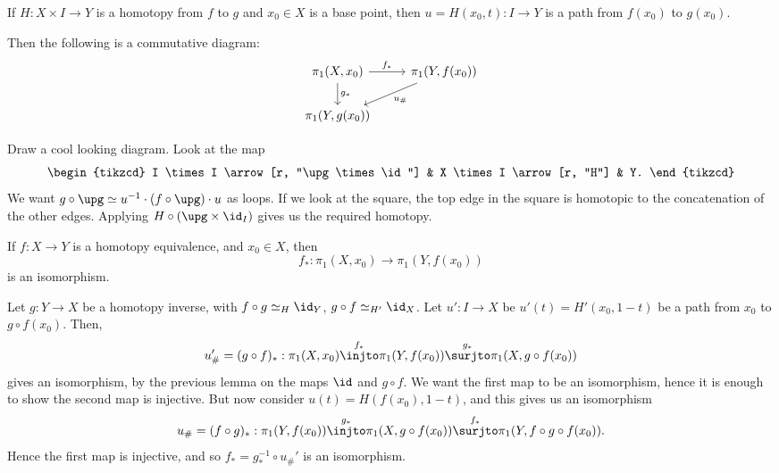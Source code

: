 \documentclass[12pt]{article}
\begin{document}
\begin{lemma}
	If $H : X \times I \to Y$ is a homotopy from $f$ to $g$ and $x_0 \in X$ is a base point, then $u = H(x_0, t) : I \to Y$ is a path from $f(x_0)$ to $g(x_0)$.

	Then the following is a commutative diagram:
	\[
	\begin{tikzcd}
		\pi_1(X, x_0) \arrow[r, "f_\ast"] \arrow[d, "g_\ast"] & \pi_1(Y, f(x_0)) \arrow[dl, "u_{\#}"] \\
		\pi_1(Y, g(x_0)) &
	\end{tikzcd}
\]
\end{lemma}

\begin{proofbox}
	Draw a cool looking diagram. Look at the map
	\[
	\begin{tikzcd}
		I \times I \arrow[r, "\upg \times \id"] & X \times I \arrow[r, "H"] & Y.
	\end{tikzcd}
	\]
	We want $g \circ \upg \simeq u^{-1} \cdot (f \circ \upg) \cdot u$ as loops. If we look at the square, the top edge in the square is homotopic to the concatenation of the other edges. Applying $H \circ (\upg\times \id_I)$ gives us the required homotopy.
\end{proofbox}


\begin{theorem}
	If $f : X \to Y$ is a homotopy equivalence, and $x_0 \in X$, then
	\[
	f_\ast : \pi_1(X, x_0) \to \pi_1(Y, f(x_0))
	\]
	is an isomorphism.
\end{theorem}

\begin{proofbox}
	Let $g : Y \to X$ be a homotopy inverse, with $f \circ g \simeq_H \id_Y$, $g \circ f \simeq_{H'} \id_X$. Let $u' : I \to X$ be $u'(t) = H'(x_0, 1-t)$ be a path from $x_0$ to $g \circ f(x_0)$. Then,
	\[
		u'_{\#} = (g \circ f)_{\ast} : \pi_1(X, x_0) \overset{f_\ast}{\injto} \pi_1(Y, f(x_0)) \overset{g_\ast}{\surjto} \pi_1(X, g \circ f(x_0))
	\]
	gives an isomorphism, by the previous lemma on the maps $\id$ and $g \circ f$. We want the first map to be an isomorphism, hence it is enough to show the second map is injective. But now consider $u(t) = H(f(x_0), 1-t)$, and this gives us an isomorphism
	\[
		u_{\#} = (f \circ g)_{\ast} : \pi_1(Y, f(x_0)) \overset{g_\ast}{\injto} \pi_1(X, g \circ f(x_0)) \overset{f_\ast}{\surjto} \pi_1(Y, f \circ g \circ f(x_0)).
	\]
	Hence the first map is injective, and so $f_\ast = g_\ast^{-1} \circ u_{\#}'$ is an isomorphism.
\end{proofbox}
\end{document}

